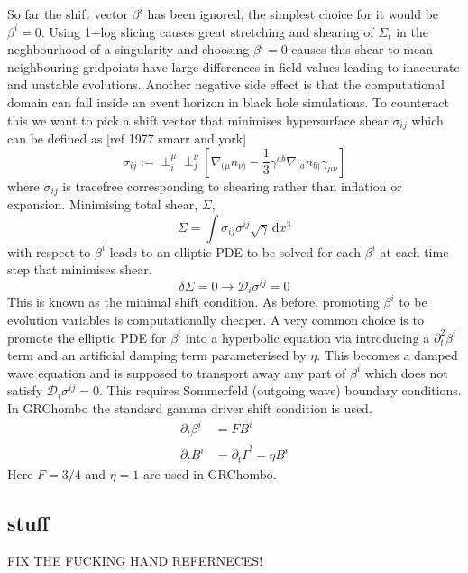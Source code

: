 \documentclass[11pt, oneside]{report}  %
\newcommand{\D}{\mathcal{D}}
\newcommand{\dd}{\mathrm{d}}
\numberwithin{equation}{section}
\begin{document}
So far the shift vector $\beta^i$ has been ignored, the simplest choice for it would be $\beta^i=0$. Using 1+log slicing causes great stretching and shearing of $\Sigma_t$ in the neghbourhood of a singularity and choosing $\beta^i=0$ causes this shear to mean neighbouring gridpoints have large differences in field values leading to inaccurate and unstable evolutions. Another negative side effect is that the computational domain can fall inside an event horizon in black hole simulations. To counteract this we want to pick a shift vector that minimises hypersurface shear $\sigma_{ij}$ which can be defined as [ref 1977 smarr and york]
\begin{equation} \sigma_{ij}:= \perp^\mu_i \perp^\nu_j \left[\nabla_{(\mu} n_{\nu)}-\frac{1}{3}\gamma^{ab}\nabla_{(a} n_{b)} \gamma_{\mu\nu}\right] \end{equation}
where $\sigma_{ij}$ is tracefree corresponding to shearing rather than inflation or expansion. Minimising total shear, $\Sigma$,
\begin{equation} \Sigma = \int \sigma_{ij}\sigma^{ij}\sqrt{\gamma}\,\dd x^3\end{equation}
with respect to $\beta^i$ leads to an elliptic PDE to be solved for each $\beta^i$ at each time step that minimises shear. 
\begin{equation} \delta \Sigma = 0 \rightarrow \D_i\sigma^{ij}=0\end{equation}
This is known as the minimal shift condition. As before, promoting $\beta^i$ to be evolution variables is computationally cheaper. A very common choice is to promote the elliptic PDE for $\beta^i$ into a hyperbolic equation via introducing a $\partial_t^2\beta^i$ term and an artificial damping term parameterised by $\eta$. This becomes a damped wave equation and is supposed to transport away any part of $\beta^i$ which does not satisfy $\D_i \sigma^{ij}=0$. This requires Sommerfeld (outgoing wave) boundary conditions. In GRChombo the standard gamma driver shift condition is used.
\begin{align} \partial_t \beta^i &= FB^i\\
 \partial_t B^i &= \partial_t \tilde{\Gamma}^i - \eta B^i\end{align}
Here $F=3/4$ and $\eta=1$ are used in GRChombo.


\subsection{stuff}
FIX THE FUCKING HAND REFERNECES!
\end{document}
